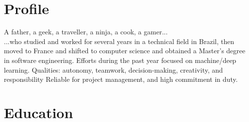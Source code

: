 \documentclass[letterpaper]{twentysecondcv} %
\begin{document}
\makeprofile %


\section{Profile}

A father, a geek, a traveller, a ninja, a cook, a gamer... \\ ...who studied and
worked for several years in a technical field in Brazil, then moved to France
and shifted to computer science and obtained a Master’s degree in software
engineering. Efforts during the past year focused on machine/deep learning.
Qualities: autonomy, teamwork, decision-making, creativity, and responsibility
Reliable for project management, and high commitment in duty.





\section{Education}
\end{document}
